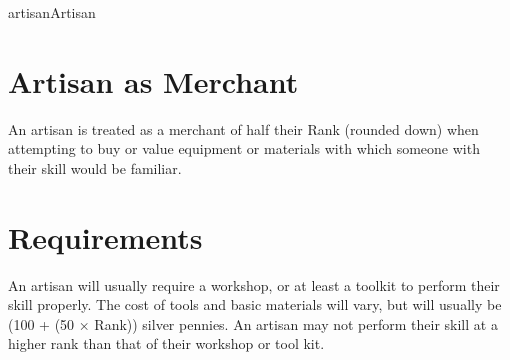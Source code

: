 \begin{Skill}[2.0]{artisan}{Artisan}
\section{Artisan as Merchant}

An artisan is treated as a merchant of half their Rank (rounded down)
when attempting to buy or value equipment or materials with which
someone with their skill would be familiar.

\section{Requirements}
An artisan will usually require a workshop, or at least a toolkit to
perform their skill properly.  The cost of tools and basic materials
will vary, but will usually be (100 + (50 × Rank)) silver pennies. An
artisan may not perform their skill at a higher rank than that of
their workshop or tool kit.

\end{Skill}
